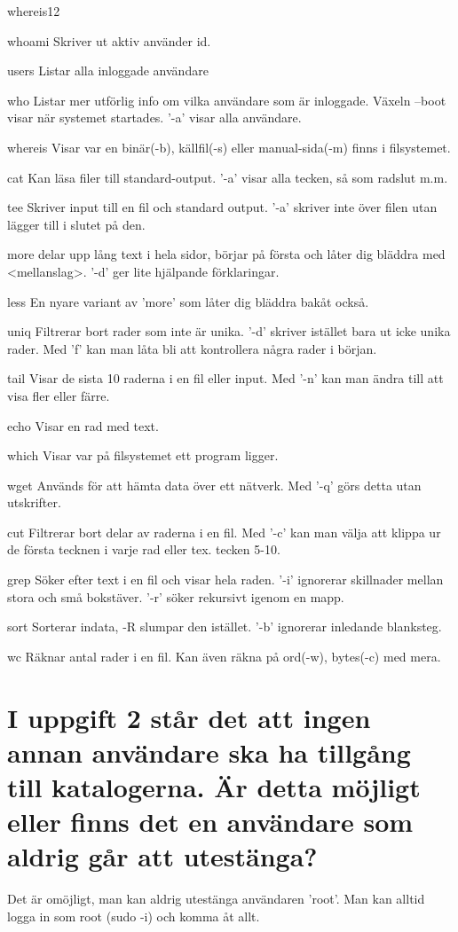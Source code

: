 \documentclass[11pt]{article}
\begin{document}
\begin{labeling}{whereis12}
\item [whoami] Skriver ut aktiv använder id.
\item [users] Listar alla inloggade användare
\item [who] Listar mer utförlig info om vilka användare som är inloggade. Växeln --boot visar när systemet startades. '-a' visar alla användare.
\item [whereis] Visar var en binär(-b), källfil(-s) eller manual-sida(-m) finns i filsystemet.
\item [cat] Kan läsa filer till standard-output. '-a' visar alla tecken, så som radslut m.m.
\item [tee] Skriver input till en fil och standard output. '-a' skriver inte över filen utan lägger till i slutet på den.
\item [more] delar upp lång text i hela sidor, börjar på första och låter dig bläddra med <mellanslag>. '-d' ger lite hjälpande förklaringar.
\item [less] En nyare variant av 'more' som låter dig bläddra bakåt också.
\item [uniq] Filtrerar bort rader som inte är unika. '-d' skriver istället bara ut icke unika rader. Med 'f' kan man låta bli att kontrollera några rader i början.
\item [tail] Visar de sista 10 raderna i en fil eller input. Med '-n' kan man ändra till att visa fler eller färre.
\item [echo] Visar en rad med text.
\item [which] Visar var på filsystemet ett program ligger.
\item [wget] Används för att hämta data över ett nätverk.  Med '-q' görs detta utan utskrifter.
\item [cut] Filtrerar bort delar av raderna i en fil. Med '-c' kan man välja att klippa ur de första tecknen i varje rad eller tex. tecken 5-10.
\item [grep] Söker efter text i en fil och visar hela raden. '-i' ignorerar skillnader mellan stora och små bokstäver. '-r' söker rekursivt igenom en mapp.
\item [sort] Sorterar indata, -R slumpar den istället. '-b' ignorerar inledande blanksteg.
\item [wc] Räknar antal rader i en fil. Kan även räkna på ord(-w), bytes(-c) med mera.
\end{labeling}

\section{I uppgift 2 står det att ingen annan användare ska ha tillgång till katalogerna. Är detta möjligt eller finns det en användare som aldrig går att utestänga?}
Det är omöjligt, man kan aldrig utestänga användaren 'root'. Man kan alltid logga in som root (sudo -i) och komma åt allt.
\end{document}
